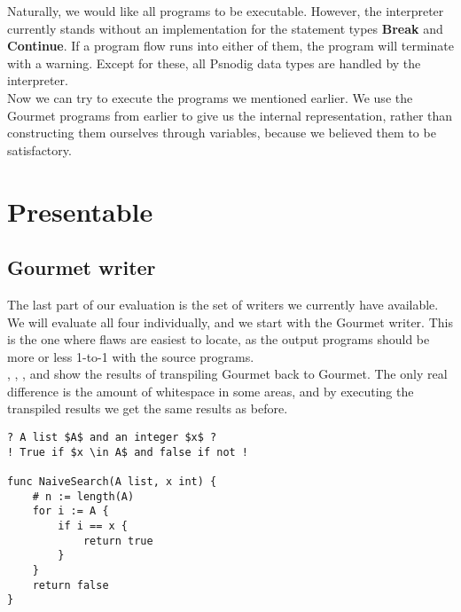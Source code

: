 Naturally, we would like all programs to be executable. However, the interpreter currently stands without an implementation for the statement types \textbf{Break} and \textbf{Continue}. If a program flow runs into either of them, the program will terminate with a warning. Except for these, all Psnodig data types are handled by the interpreter. \\

Now we can try to execute the programs we mentioned earlier. We use the Gourmet programs from earlier to give us the internal representation, rather than constructing them ourselves through variables, because we believed them to be satisfactory.

\section{Presentable}


\subsection{Gourmet writer}

The last part of our evaluation is the set of writers we currently have available. We will evaluate all four individually, and we start with the Gourmet writer. This is the one where flaws are easiest to locate, as the output programs should be more or less 1-to-1 with the source programs. \\

, , , and  show the results of transpiling Gourmet back to Gourmet. The only real difference is the amount of whitespace in some areas, and by executing the transpiled results we get the same results as before. \\

\begin{lstlisting}[caption={The result of transpiling \Cref{naiveSearchGourmet} back to Gourmet.}, captionpos=b, label={naiveSearchGourmet2}]
? A list $A$ and an integer $x$ ?
! True if $x \in A$ and false if not !

func NaiveSearch(A list, x int) {
	# n := length(A)
	for i := A {
		if i == x {
			return true
		}
	}
	return false
}
\end{lstlisting}

